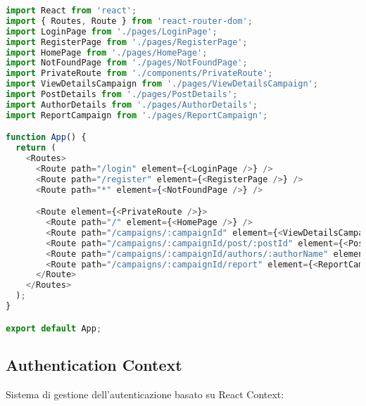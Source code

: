 \documentclass[12pt,a4paper]{report}
\begin{document}
\begin{lstlisting}[language=JavaScript, caption=App.js - Main Application Structure]
import React from 'react';
import { Routes, Route } from 'react-router-dom';
import LoginPage from './pages/LoginPage';
import RegisterPage from './pages/RegisterPage';
import HomePage from './pages/HomePage';
import NotFoundPage from './pages/NotFoundPage';
import PrivateRoute from './components/PrivateRoute';
import ViewDetailsCampaign from './pages/ViewDetailsCampaign';
import PostDetails from './pages/PostDetails';
import AuthorDetails from './pages/AuthorDetails';
import ReportCampaign from './pages/ReportCampaign';

function App() {
  return (
    <Routes>
      <Route path="/login" element={<LoginPage />} />
      <Route path="/register" element={<RegisterPage />} />
      <Route path="*" element={<NotFoundPage />} />

      <Route element={<PrivateRoute />}>
        <Route path="/" element={<HomePage />} />
        <Route path="/campaigns/:campaignId" element={<ViewDetailsCampaign />}/>
        <Route path="/campaigns/:campaignId/post/:postId" element={<PostDetails />}/>
        <Route path="/campaigns/:campaignId/authors/:authorName" element={<AuthorDetails />} />
        <Route path="/campaigns/:campaignId/report" element={<ReportCampaign />} /> 
      </Route>
    </Routes>
  );
}

export default App;
\end{lstlisting}

\subsection{Authentication Context}

Sistema di gestione dell'autenticazione basato su React Context:
\end{document}

